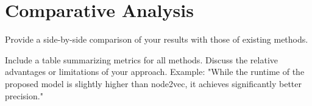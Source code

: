 \section{ Comparative Analysis}
 Provide a side-by-side comparison of your results with those of existing methods.

Include a table summarizing metrics for all methods.
Discuss the relative advantages or limitations of your approach.
Example: "While the runtime of the proposed model is slightly higher than node2vec, it achieves significantly better precision."